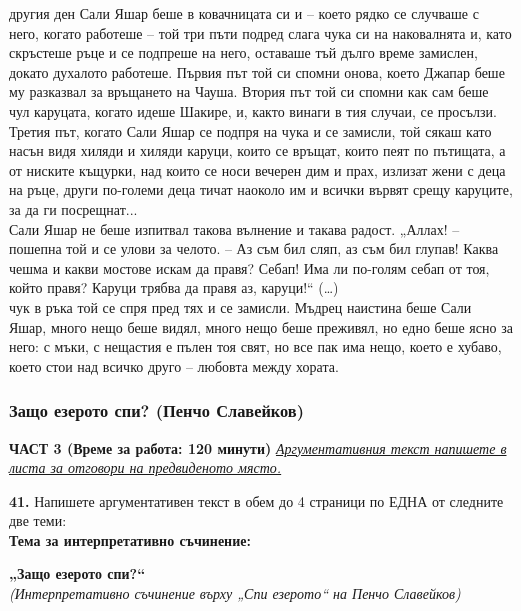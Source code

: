 \documentclass[12pt,a4paper]{article}
\begin{document}
 другия ден Сали Яшар беше в ковачницата си и – което рядко се случваше с него,
когато работеше – той три пъти подред слага чука си на наковалнята и, като скръстеше ръце
и се подпреше на него, оставаше тъй дълго време замислен, докато духалото работеше.
Първия път той си спомни онова, което Джапар беше му разказвал за връщането на Чауша.
Втория път той си спомни как сам беше чул каруцата, когато идеше Шакире, и, както винаги
в тия случаи, се просълзи. Третия път, когато Сали Яшар се подпря на чука и се замисли, той
сякаш като насън видя хиляди и хиляди каруци, които се връщат, които пеят по пътищата, а
от ниските къщурки, над които се носи вечерен дим и прах, излизат жени с деца на ръце,
други по-големи деца тичат наоколо им и всички вървят срещу каруците, за да ги
посрещнат...\\
 Сали Яшар не беше изпитвал такова вълнение и такава радост. „Аллах! –
пошепна той и се улови за челото. – Аз съм бил сляп, аз съм бил глупав! Каква чешма и
какви мостове искам да правя? Себап! Има ли по-голям себап от тоя, който правя? Каруци
трябва да правя аз, каруци!“ (…)\\
 чук в ръка той се спря пред тях и се замисли. Мъдрец наистина беше Сали Яшар,
много нещо беше видял, много нещо беше преживял, но едно беше ясно за него: с мъки, с
нещастия е пълен тоя свят, но все пак има нещо, което е хубаво, което стои над всичко друго
– любовта между хората.

\subsubsection{Защо езерото спи? (Пенчо Славейков)}
\vspace{0.5cm}
\begin{center}
\textbf{ЧАСТ 3 (Време за работа: 120 минути)}
\vspace{0.2cm}
{\textit{\underline{Аргументативния текст напишете в листа за отговори на предвиденото място.}}}
\vspace{0.1cm}
\end{center}
\textbf{41.} Напишете аргументативен текст в обем до 4 страници по ЕДНА от следните две теми:
\\
\vspace{0.2cm}
\textbf{Тема за интерпретативно съчинение:}
\vspace{0.1cm}
\begin{center}
\textbf{„Защо езерото спи?“}
\\
\textit{(Интерпретативно съчинение върху „Спи езерото“ на Пенчо Славейков)}
\end{center}
\end{document}
